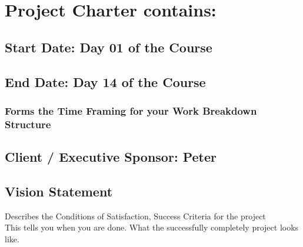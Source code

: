 \section*{Project Charter contains:}

\subsection*{Start Date: Day 01 of the Course}
\subsection*{End Date: Day 14 of the Course}
\subsubsection{Forms the Time Framing for your Work Breakdown Structure}

\subsection*{Client / Executive Sponsor: Peter}

\subsection*{Vision Statement}
Describes the Conditions of Satisfaction, Success Criteria for the project
\\This tells you when you are done. What the successfully completely project looks like.


